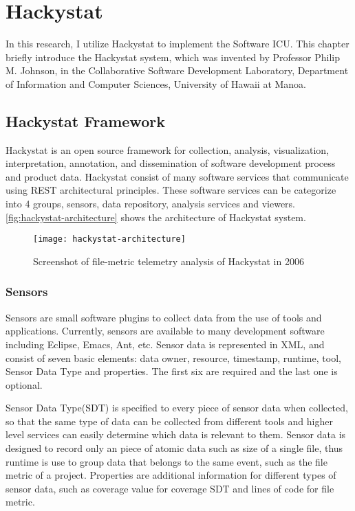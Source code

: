 \chapter{Hackystat}
In this research, I utilize Hackystat to implement the Software ICU. This chapter briefly introduce the Hackystat system, which was invented by Professor Philip M. Johnson, in the Collaborative Software Development Laboratory, Department of Information and Computer Sciences, University of Hawaii at Manoa. 
 
\section{Hackystat Framework}
Hackystat is an open source framework for collection, analysis, visualization, interpretation, annotation, and dissemination of software development process and product data. Hackystat consist of many software services that communicate using REST architectural principles\cite{wiki:restful}. These software services can be categorize into 4 groups, sensors, data repository, analysis services and viewers. \autoref{fig:hackystat-architecture} shows the architecture of Hackystat system. 

\begin{figure}[htbp]
   \centering
   \texttt{[image: hackystat-architecture]} 
   \caption{Screenshot of file-metric telemetry analysis of Hackystat in 2006}
   \label{fig:hackystat-architecture}
\end{figure}

\subsection{Sensors}
Sensors are small software plugins to collect data from the use of tools and applications. Currently, sensors are available to many development software including Eclipse, Emacs, Ant, etc. Sensor data is represented in XML, and consist of seven basic elements: data owner, resource, timestamp, runtime, tool, Sensor Data Type and properties. The first six are required and the last one is optional. 

Sensor Data Type(SDT) is specified to every piece of sensor data when collected, so that the same type of data can be collected from different tools and higher level services can easily determine which data is relevant to them. Sensor data is designed to record only an piece of atomic data such as size of a single file, thus runtime is use to group data that belongs to the same event, such as the file metric of a project. Properties are additional information for different types of sensor data, such as coverage value for coverage SDT and lines of code for file metric. 

